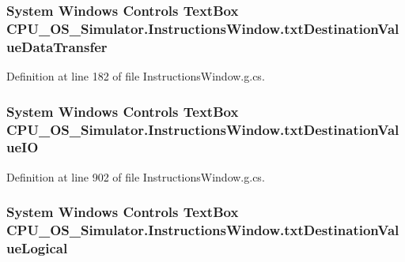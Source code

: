 \subsubsection[{txt\+Destination\+Value\+Data\+Transfer}]{\setlength{\rightskip}{0pt plus 5cm}System Windows Controls Text\+Box C\+P\+U\+\_\+\+O\+S\+\_\+\+Simulator.\+Instructions\+Window.\+txt\+Destination\+Value\+Data\+Transfer\hspace{0.3cm}{\ttfamily [package]}}\label{class_c_p_u___o_s___simulator_1_1_instructions_window_a84f7cc6d64bd8050be7c729f469cd29c}


Definition at line 182 of file Instructions\+Window.\+g.\+cs.

\hypertarget{class_c_p_u___o_s___simulator_1_1_instructions_window_afd9084fd83f0c60a4fa1bba1cbcaf5af}{}
\subsubsection[{txt\+Destination\+Value\+I\+O}]{\setlength{\rightskip}{0pt plus 5cm}System Windows Controls Text\+Box C\+P\+U\+\_\+\+O\+S\+\_\+\+Simulator.\+Instructions\+Window.\+txt\+Destination\+Value\+I\+O\hspace{0.3cm}{\ttfamily [package]}}\label{class_c_p_u___o_s___simulator_1_1_instructions_window_afd9084fd83f0c60a4fa1bba1cbcaf5af}


Definition at line 902 of file Instructions\+Window.\+g.\+cs.

\hypertarget{class_c_p_u___o_s___simulator_1_1_instructions_window_af1a2860f125c3a8e25c73c1b04290438}{}
\subsubsection[{txt\+Destination\+Value\+Logical}]{\setlength{\rightskip}{0pt plus 5cm}System Windows Controls Text\+Box C\+P\+U\+\_\+\+O\+S\+\_\+\+Simulator.\+Instructions\+Window.\+txt\+Destination\+Value\+Logical\hspace{0.3cm}{\ttfamily [package]}}\label{class_c_p_u___o_s___simulator_1_1_instructions_window_af1a2860f125c3a8e25c73c1b04290438}


